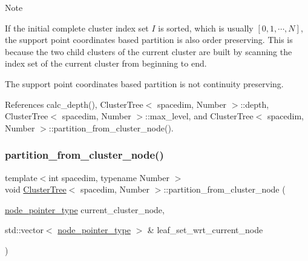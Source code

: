 \begin{DoxyDescription}
\item[Note ]
\begin{DoxyEnumerate}
\item If the initial complete cluster index set $I$ is sorted, which is usually $[0, 1, \cdots, N]$, the support point coordinates based partition is also order preserving. This is because the two child clusters of the current cluster are built by scanning the index set of the current cluster from beginning to end.
\item The support point coordinates based partition is not continuity preserving.  
\end{DoxyEnumerate}
\end{DoxyDescription}

References calc\+\_\+depth(), Cluster\+Tree$<$ spacedim, Number $>$\+::depth, Cluster\+Tree$<$ spacedim, Number $>$\+::max\+\_\+level, and Cluster\+Tree$<$ spacedim, Number $>$\+::partition\+\_\+from\+\_\+cluster\+\_\+node().

\mbox{\label{classClusterTree_a8b650f0c7cc83adbde5aad9556a57ac3}} 
\subsubsection{\texorpdfstring{partition\+\_\+from\+\_\+cluster\+\_\+node()}{partition\_from\_cluster\_node()}\hspace{0.1cm}{\footnotesize\ttfamily [1/3]}}
{\footnotesize\ttfamily template$<$int spacedim, typename Number $>$ \\
void \hyperlink{classClusterTree}{Cluster\+Tree}$<$ spacedim, Number $>$\+::partition\+\_\+from\+\_\+cluster\+\_\+node (\begin{DoxyParamCaption}\item[{\hyperlink{classClusterTree_ae4bb0fdc7ac559d7844d04a00ab3e9de}{node\+\_\+pointer\+\_\+type}}]{current\+\_\+cluster\+\_\+node,  }\item[{std\+::vector$<$ \hyperlink{classClusterTree_ae4bb0fdc7ac559d7844d04a00ab3e9de}{node\+\_\+pointer\+\_\+type} $>$ \&}]{leaf\+\_\+set\+\_\+wrt\+\_\+current\+\_\+node }\end{DoxyParamCaption})\hspace{0.3cm}{\ttfamily [private]}}

